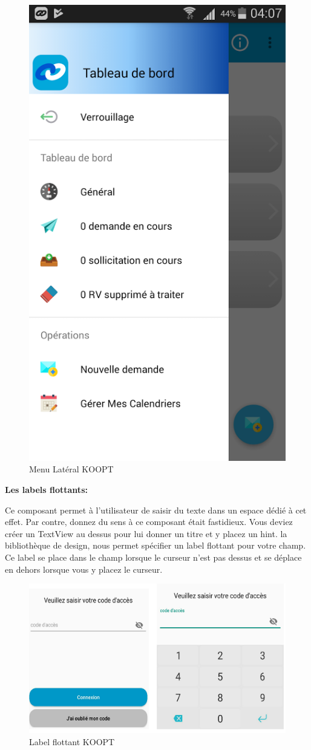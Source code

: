 \begin{figure}[H]
\begin{center}
\includegraphics[width=0.5\linewidth]{images/menu_lateral}
\end{center}
\caption{Menu Latéral KOOPT}
\label{fig:3}
\end{figure}




\textbf{Les labels flottants:}
 
 
Ce composant permet à l'utilisateur de saisir du texte dans un espace dédié à cet effet. Par contre, donnez du sens à ce composant était fastidieux. Vous deviez créer un TextView au dessus pour lui donner un titre et y placez un hint.
la bibliothèque de design, nous permet spécifier un label flottant pour votre champ. Ce label se place dans le champ lorsque le curseur n'est pas dessus et se déplace en dehors lorsque vous y placez le curseur.

\begin{figure}[H]
\begin{center}
\includegraphics[width=1\linewidth]{images/label_flottant}
\end{center}
\caption{Label flottant KOOPT}
\label{fig:5}
\end{figure}

